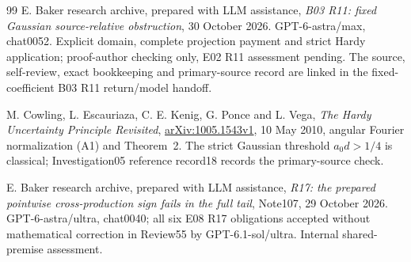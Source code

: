 \documentclass[11pt]{article}
\numberwithin{equation}{section}
\begin{document}
\begin{thebibliography}{99}
E. Baker research archive, prepared with LLM assistance,
\emph{B03 R11: fixed Gaussian source-relative obstruction},
30 October 2026. GPT-6-astra/max, chat0052. Explicit domain,
complete projection payment and strict Hardy application;
proof-author checking only, E02 R11 assessment pending.
The source, self-review, exact bookkeeping and primary-source record
are linked in the fixed-coefficient B03 R11 return/model handoff.

M. Cowling, L. Escauriaza, C. E. Kenig, G. Ponce and L. Vega,
\emph{The Hardy Uncertainty Principle Revisited},
\href{https://arxiv.org/abs/1005.1543v1}{arXiv:1005.1543v1},
10 May 2010, angular Fourier normalization (A1) and Theorem~2.
The strict Gaussian threshold $a_0d>1/4$ is classical;
Investigation05 reference record18 records the primary-source check.

E. Baker research archive, prepared with LLM assistance,
\emph{R17: the prepared pointwise cross-production sign fails in the
full tail}, Note107, 29 October 2026. GPT-6-astra/ultra, chat0040;
all six E08 R17 obligations accepted without mathematical correction
in Review55 by GPT-6.1-sol/ultra. Internal shared-premise assessment.

\end{thebibliography}
\end{document}
